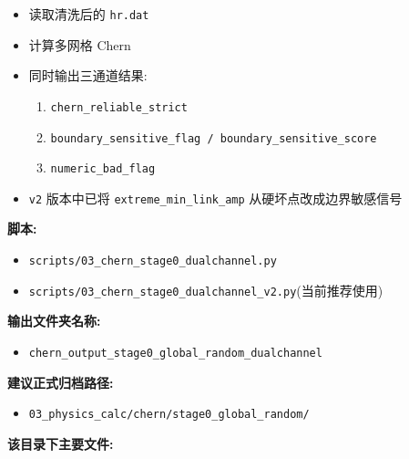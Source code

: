 \documentclass[lang=cn,scheme=chinese,color=blue,device=normal,toc=onecol,math=cm]{elegantbook}
\begin{document}
\begin{itemize}
\item 读取清洗后的 \texttt{hr.dat}
\item 计算多网格 Chern
\item 同时输出三通道结果: 
\begin{enumerate}
\item \texttt{chern\_\allowbreak{}reliable\_\allowbreak{}strict}
\item \texttt{boundary\_\allowbreak{}sensitive\_\allowbreak{}flag /\allowbreak{} boundary\_\allowbreak{}sensitive\_\allowbreak{}score}
\item \texttt{numeric\_\allowbreak{}bad\_\allowbreak{}flag}
\end{enumerate}
\item \texttt{v2} 版本中已将 \texttt{extreme\_\allowbreak{}min\_\allowbreak{}link\_\allowbreak{}amp} 从硬坏点改成边界敏感信号
\end{itemize}


\textbf{脚本:}\par


\begin{itemize}
\item \texttt{scripts/\allowbreak{}03\_\allowbreak{}chern\_\allowbreak{}stage0\_\allowbreak{}dualchannel.py}
\item \texttt{scripts/\allowbreak{}03\_\allowbreak{}chern\_\allowbreak{}stage0\_\allowbreak{}dualchannel\_\allowbreak{}v2.py}(当前推荐使用)
\end{itemize}


\textbf{输出文件夹名称:}\par


\begin{itemize}
\item \texttt{chern\_\allowbreak{}output\_\allowbreak{}stage0\_\allowbreak{}global\_\allowbreak{}random\_\allowbreak{}dualchannel}
\end{itemize}


\textbf{建议正式归档路径:}\par


\begin{itemize}
\item \texttt{03\_\allowbreak{}physics\_\allowbreak{}calc/\allowbreak{}chern/\allowbreak{}stage0\_\allowbreak{}global\_\allowbreak{}random/\allowbreak{}}
\end{itemize}


\textbf{该目录下主要文件:}\par
\end{document}
